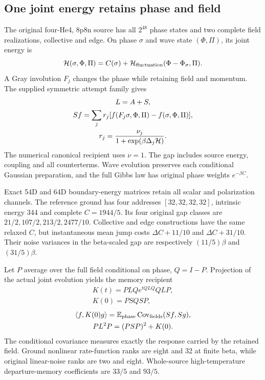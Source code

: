 \subsection{One joint energy retains phase and field}

The original four-He4, 8p8n source has all \(2^{48}\) phase states and two
complete field realizations, collective and edge. On phase \(\sigma\)
and wave state \((\Phi,\Pi)\), its joint energy is
\[
 {\cal H}(\sigma,\Phi,\Pi)
 =C(\sigma)+{\cal H}_{\rm fluctuation}(\Phi-\Phi_\sigma,\Pi).
\]
A Gray involution \(F_j\) changes the phase while retaining field and
momentum. The supplied symmetric attempt family gives
\[
\begin{gathered}
L=A+S,\\
 Sf=\sum_jr_j[f(F_j\sigma,\Phi,\Pi)-f(\sigma,\Phi,\Pi)],\\
 r_j=\frac{\nu_j}{1+\exp(\beta\Delta_j{\cal H})}.
\end{gathered}
\]
The numerical canonical recipient uses \(\nu=1\). The gap includes source
energy, coupling and all counterterms. Wave evolution preserves each
conditional Gaussian preparation, and the full Gibbs law has original
phase weights \(e^{-\beta C}\).

Exact 54D and 64D boundary-energy matrices retain all scalar and
polarization channels. The reference ground has four addresses
\([32,32,32,32]\), intrinsic energy 344 and complete \(C=1944/5\).
Its four original gap classes are \(21/2,107/2,213/2,2477/10\).
Collective and edge constructions have the same relaxed \(C\), but
instantaneous mean jump costs \(\Delta C+11/10\) and \(\Delta C+31/10\).
Their noise variances in the beta-scaled gap are respectively
\((11/5)\beta\) and \((31/5)\beta\).

Let \(P\) average over the full field conditional on phase, \(Q=I-P\).
Projection of the actual joint evolution yields the memory recipient
\[
\begin{gathered}
K(t)=PLQe^{tQLQ}QLP,\\
 K(0)=PSQSP,
\end{gathered}
\]
\[
\begin{gathered}
\langle f,K(0)g\rangle
   =\mathbb E_{\rm phase}\operatorname{Cov}_{\rm fields}(Sf,Sg),
 \\
 PL^2P=(PSP)^2+K(0).
\end{gathered}
\]
The conditional covariance measures exactly the response carried by the
retained field. Ground nonlinear rate-function ranks are eight and
32 at finite beta, while original linear-noise ranks are two and eight.
Whole-source high-temperature departure-memory coefficients are \(33/5\)
and \(93/5\).

